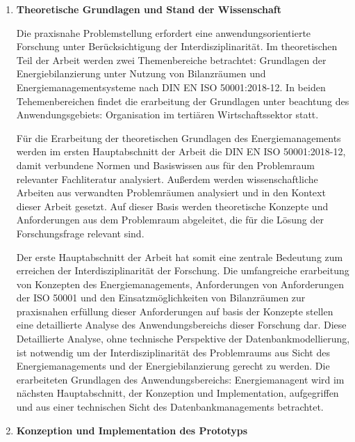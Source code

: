 \begin{enumerate}
    \item \textbf{Theoretische Grundlagen und Stand der Wissenschaft}
    
    Die praxisnahe Problemstellung erfordert eine anwendungsorientierte Forschung unter Berücksichtigung der Interdisziplinarität. 
    Im theoretischen Teil der Arbeit werden zwei Themenbereiche betrachtet: Grundlagen der Energiebilanzierung unter Nutzung von Bilanzräumen und  
    Energiemanagementsysteme nach DIN EN ISO 50001:2018-12. In beiden Tehemenbereichen findet die erarbeitung der Grundlagen unter beachtung des Anwendungsgebiets: 
    Organisation im tertiären Wirtschaftssektor statt. 
    
    Für die Erarbeitung der theoretischen Grundlagen des Energiemanagements werden im ersten Hauptabschnitt der Arbeit die DIN EN ISO 50001:2018-12, 
    damit verbundene Normen und Basiswissen aus für den Problemraum relevanter Fachliteratur analysiert.
    Außerdem werden wissenschaftliche Arbeiten aus verwandten Problemräumen analysiert und in den Kontext dieser Arbeit gesetzt.
    Auf dieser Basis werden theoretische Konzepte und Anforderungen aus dem Problemraum abgeleitet, die für die Lösung der Forschungsfrage relevant sind.
    
    Der erste Hauptabschnitt der Arbeit hat somit eine zentrale Bedeutung zum erreichen der Interdisziplinarität der Forschung.
    Die umfangreiche erarbeitung von Konzepten des Energiemanagements, Anforderungen von Anforderungen der ISO 50001 und den Einsatzmöglichkeiten 
    von Bilanzräumen zur praxisnahen erfüllung dieser Anforderungen auf basis der Konzepte stellen eine detaillierte Analyse des Anwendungsbereichs dieser 
    Forschung dar.
    Diese Detaillierte Analyse, ohne technische Perspektive der Datenbankmodellierung, ist notwendig um der Interdisziplinarität des Problemraums aus Sicht des 
    Energiemanagements und der Energiebilanzierung gerecht zu werden. 
    Die erarbeiteten Grundlagen des Anwendungsbereichs: Energiemanagent wird im nächsten Hauptabschnitt, der Konzeption und Implementation, 
    aufgegriffen und aus einer technischen Sicht des Datenbankmanagements betrachtet.

    \item \textbf{Konzeption und Implementation des Prototyps}


\end{enumerate}
